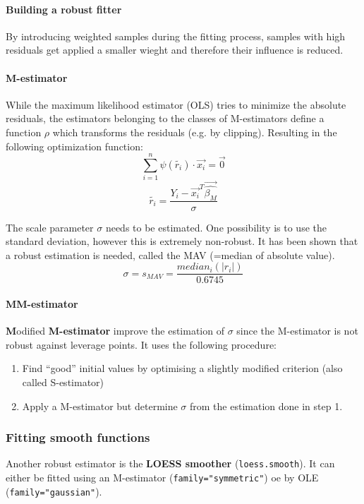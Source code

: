 \paragraph{Building a robust fitter}
By introducing weighted samples during the fitting process, samples with high residuals get applied a smaller wieght and therefore their influence is reduced.

\paragraph{M-estimator}
While the maximum likelihood estimator (OLS) tries to minimize the absolute residuals, the estimators belonging to the classes of M-estimators define a function $\rho$ which transforms the residuals (e.g. by clipping). Resulting in the following optimization function:
\begin{equation*}
\sum_{i=1}^{n}\psi(\tilde{r_i}) \cdot \vec{x_i} = \vec{0}
\end{equation*}
\begin{equation*}
\tilde{r_i} = \frac{Y_i-\vec{x_i}^T\vec{\hat{\beta_M}}}{\sigma}
\end{equation*}

The scale parameter $\sigma$ needs to be estimated. One possibility is to use the standard deviation, however this is extremely non-robust. It has been shown that a robust estimation is needed, called the MAV (=median of absolute value).
\begin{equation*}
	\sigma = s_{MAV} = \frac{median_i(|r_i|)}{0.6745}
\end{equation*}

\paragraph{MM-estimator}
\textbf{M}odified \textbf{M-estimator} improve the estimation of $\sigma$ since the M-estimator is not robust against leverage points. It uses the following procedure:
\begin{enumerate}
	\tightlist
	\item Find “good” initial values by optimising a slightly modified criterion (also called S-estimator)
	\item Apply a M-estimator but determine $\sigma$ from the estimation done in step 1.
\end{enumerate}

\subsubsection{Fitting smooth functions}
Another robust estimator is the \textbf{LOESS smoother} (\lstinline{loess.smooth}). It can either be fitted using an M-estimator (\lstinline{family="symmetric"}) oe by OLE (\lstinline{family="gaussian"}).


